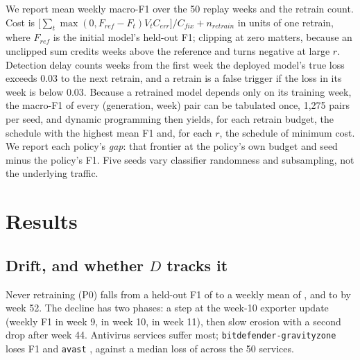 \documentclass[conference]{IEEEtran}
\begin{document}
We report mean weekly macro-F1 over the 50 replay weeks and the retrain count. Cost is $\bigl[\sum_t\max(0,F_{ref}-F_t)V_tC_{err}\bigr]/C_{fix}+n_{retrain}$ in units of one retrain, where $F_{ref}$ is the initial model's held-out F1; clipping at zero matters, because an unclipped sum credits weeks above the reference and turns negative at large $r$. Detection delay counts weeks from the first week the deployed model's true loss exceeds 0.03 to the next retrain, and a retrain is a false trigger if the loss in its week is below 0.03. Because a retrained model depends only on its training week, the macro-F1 of every (generation, week) pair can be tabulated once, 1,275 pairs per seed, and dynamic programming then yields, for each retrain budget, the schedule with the highest mean F1 and, for each $r$, the schedule of minimum cost. We report each policy's \emph{gap}: that frontier at the policy's own budget and seed minus the policy's F1. Five seeds vary classifier randomness and subsampling, not the underlying traffic.

\begin{table}[t]
\caption{Policy comparison on CESNET-TLS-Year22, default $r=10$. Mean over five seeds; $\pm$ is the standard deviation of macro-F1. Gap: points of macro-F1 below the DP-optimal schedule with the same number of retrains (\gapscope). Cost: units of one retrain, error cost clipped at zero. Delay in weeks; FT: false-trigger rate.}
\label{tab:main}
\centering\footnotesize

\end{table}

\section{Results}\label{sec:results}
\subsection{Drift, and whether $D$ tracks it}
Never retraining (P0) falls from a held-out F1 of \pzeroref{} to a weekly mean of \pzeromean{}, and to \pzeromin{} by week 52. The decline has two phases: a step at the week-10 exporter update (weekly F1 \pzerowkNine{} in week 9, \pzerowkTen{} in week 10, \pzerowkEleven{} in week 11), then slow erosion with a second drop after week 44. Antivirus services suffer most; \texttt{bitdefender-gravityzone} loses \psvcone{} F1 and \texttt{avast} \psvctwo{}, against a median loss of \psvcmed{} across the 50 services.
\end{document}
